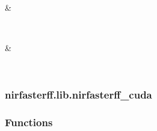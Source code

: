 \documentclass[letterpaper,10pt,english]{sphinxmanual}
\begin{document}
\begin{fulllineitems}
\begin{savenotes}
\begin{longtable}{}
\begin{varwidth}[t]{}
\sphinxbeforeendvarwidth
\end{varwidth}%
\\
\sphinxhline\begin{varwidth}[t]{}
\sphinxAtStartPar
{}
\sphinxbeforeendvarwidth
\end{varwidth}%
&\begin{varwidth}[t]{}
\sphinxAtStartPar

\sphinxbeforeendvarwidth
\end{varwidth}%
\\
\sphinxhline\begin{varwidth}[t]{}
\sphinxAtStartPar
{}
\sphinxbeforeendvarwidth
\end{varwidth}%
&\begin{varwidth}[t]{}
\sphinxAtStartPar

\sphinxbeforeendvarwidth
\end{varwidth}%
\\
\sphinxbottomrule
\end{longtable}
\sphinxtableafterendhook
\sphinxatlongtableend
\end{savenotes}

\end{fulllineitems}


\sphinxstepscope


\subsubsection{nirfasterff.lib.nirfasterff\_cuda}
\label{\detokenize{_autosummary/nirfasterff.lib.nirfasterff_cuda:module-nirfasterff.lib.nirfasterff_cuda}}\label{\detokenize{_autosummary/nirfasterff.lib.nirfasterff_cuda:nirfasterff-lib-nirfasterff-cuda}}\label{\detokenize{_autosummary/nirfasterff.lib.nirfasterff_cuda::doc}}\subsubsection*{Functions}
\end{document}
